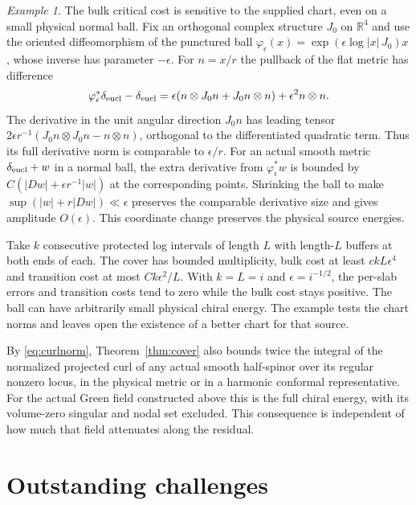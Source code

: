 \documentclass[11pt]{article}
\theoremstyle{remark}
\newtheorem{example}[theorem]{Example}
\newcommand{\R}{\mathbb R}
\begin{document}
\begin{example}
The bulk critical cost is sensitive to the supplied chart, even on a small physical normal ball. Fix an orthogonal complex structure \(J_0\) on \(\R^4\) and use the oriented diffeomorphism of the punctured ball
\(\varphi_\epsilon(x)=\exp(\epsilon\log|x|\,J_0)x\), whose inverse has parameter \(-\epsilon\).
For \(n=x/r\) the pullback of the flat metric has difference
\[
 \varphi_\epsilon^*\delta_{\rm eucl}-\delta_{\rm eucl}
  =\epsilon(n\otimes J_0n+J_0n\otimes n)+\epsilon^2 n\otimes n .
\]
The derivative in the unit angular direction \(J_0n\) has leading tensor \(2\epsilon r^{-1}(J_0n\otimes J_0n-n\otimes n)\), orthogonal to the differentiated quadratic term. Thus its full derivative norm is comparable to \(\epsilon/r\). For an actual smooth metric \(\delta_{\rm eucl}+w\) in a normal ball, the extra derivative from \(\varphi_\epsilon^*w\) is bounded by \(C(|Dw|+\epsilon r^{-1}|w|)\) at the corresponding points. Shrinking the ball to make \(\sup(|w|+r|Dw|)\ll\epsilon\) preserves the comparable derivative size and gives amplitude \(O(\epsilon)\). This coordinate change preserves the physical source energies.

Take \(k\) consecutive protected log intervals of length \(L\) with length-\(L\) buffers at both ends of each. The cover has bounded multiplicity, bulk cost at least \(c kL\epsilon^4\) and transition cost at most \(C k\epsilon^2/L\). With \(k=L=i\) and \(\epsilon=i^{-1/2}\), the per-slab errors and transition costs tend to zero while the bulk cost stays positive. The ball can have arbitrarily small physical chiral energy. The example tests the chart norms and leaves open the existence of a better chart for that source.
\end{example}

By \eqref{eq:curlnorm}, Theorem~\ref{thm:cover} also bounds twice the integral of the normalized projected curl of any actual smooth half-spinor over its regular nonzero locus, in the physical metric or in a harmonic conformal representative. For the actual Green field constructed above this is the full chiral energy, with its volume-zero singular and nodal set excluded. This consequence is independent of how much that field attenuates along the residual.

\section{Outstanding challenges}
\end{document}
